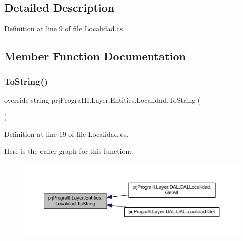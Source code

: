 \subsection{Detailed Description}


Definition at line 9 of file Localidad.\+cs.



\subsection{Member Function Documentation}
\hypertarget{classprj_progra_i_i_i_1_1_layer_1_1_entities_1_1_localidad_a4db71a3a17679f4e89717260d7d7b6cb}{}\label{classprj_progra_i_i_i_1_1_layer_1_1_entities_1_1_localidad_a4db71a3a17679f4e89717260d7d7b6cb} 
\subsubsection{\texorpdfstring{To\+String()}{ToString()}}
{\footnotesize\ttfamily override string prj\+Progra\+I\+I\+I.\+Layer.\+Entities.\+Localidad.\+To\+String (\begin{DoxyParamCaption}{ }\end{DoxyParamCaption})}



Definition at line 19 of file Localidad.\+cs.

Here is the caller graph for this function\+:
\nopagebreak
\begin{figure}[H]
\begin{center}
\leavevmode
\includegraphics[width=350pt]{classprj_progra_i_i_i_1_1_layer_1_1_entities_1_1_localidad_a4db71a3a17679f4e89717260d7d7b6cb_icgraph}
\end{center}
\end{figure}


